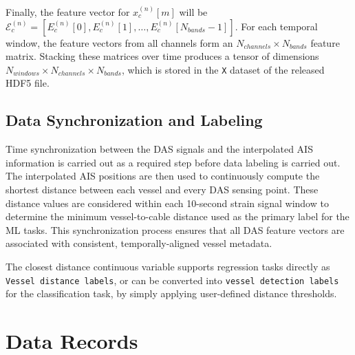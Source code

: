 \documentclass[11pt]{article}
\begin{document}
Finally, the feature vector for $x_c^{(n)}[m]$ will be $\mathcal{E}_c^{(n)} = \left[ E_c^{(n)}[0], E_c^{(n)}[1], \dots, E_c^{(n)}[N_{bands}-1] \right]$.
For each temporal window, the feature vectors from all channels form an $N_{channels}\times N_{bands}$ feature matrix. Stacking these matrices over time produces a tensor of dimensions
$N_{windows}\times N_{channels}\times N_{bands}$, which is stored in the \texttt{X} dataset of the released HDF5 file.


\subsection{Data Synchronization and Labeling}
\label{sec:ais data and label generation}

Time synchronization between the DAS signals and the interpolated AIS information is carried out as a required step before data labeling is carried out. The interpolated AIS positions are then used to continuously compute the shortest distance between each vessel and every DAS sensing point. These distance values are considered within each 10-second strain signal window to determine the minimum vessel-to-cable distance used as the primary label for the ML tasks. This synchronization process ensures that all DAS feature vectors are associated with consistent, temporally-aligned vessel metadata.

The closest distance continuous variable supports regression tasks directly as \texttt{Vessel distance labels}, or can be converted into \texttt{vessel detection labels} for the classification task, by simply applying user-defined distance thresholds.


\section{Data Records}
\label{sec:data records}
\end{document}

